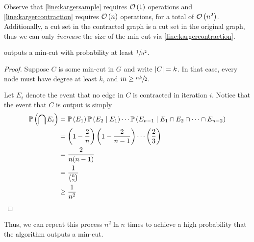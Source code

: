 Observe that \cref{line:kargersample} requires $\mathcal{O}\left(1\right)$ operations and
\cref{line:kargercontraction} requires $\mathcal{O}\left(n\right)$ operations, for a total of
$\mathcal{O}\left(n^2\right)$. Additionally, a cut set in the contracted graph is a cut set in
the original graph, thus we can only \emph{increase} the size of the min-cut via
\cref{line:kargercontraction}.

\begin{theorem}{}{}
     outputs a min-cut with probability at least
    $\sfrac{1}{n^2}$.
\end{theorem}

\begin{proof}
    Suppose $C$ is some min-cut in $G$ and write $\left\lvert C\right\rvert = k$. In that case,
    every node must have degree at least $k$, and $m \geq \sfrac{nk}{2}$. 

    Let $E_i$ denote the event that no edge in $C$ is contracted in iteration
    $i$. Notice that the event that $C$ is output is simply
    \begin{align*}\operatorname{\mathbb{P}}\left(\bigcap E_i\right)
        &=\operatorname{\mathbb{P}}\left(E_1\right)\operatorname{\mathbb{P}}\left(E_2 \mid E_1\right)\cdots\operatorname{\mathbb{P}}\left(E_{n-1} \mid E_1 \cap E_2 \cap \dots \cap E_{n - 2}\right)\\
        &=\left(1 - \frac{2}{n}\right)\left(1 - \frac{2}{n-1}\right)\cdots\left(\frac{2}{3}\right)\\
        &=\frac{2}{n(n-1)}\\
        &=\frac{1}{\binom{n}{2}}\\
        &\geq\frac{1}{n^2}
    \end{align*}
\end{proof}

Thus, we can repeat this process $n^2\ln{n}$ times to achieve a high probability
that the algorithm outputs a min-cut.